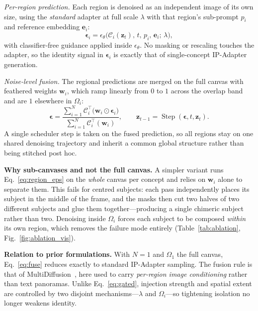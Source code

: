 \documentclass[review,10pt,times]{elsarticle}
\begin{document}
\noindent\textit{Per-region prediction.}  Each region is denoised as an
independent image of its own size, using the \emph{standard} adapter at
full scale $\lambda$ with that region's sub-prompt $p_i$ and reference
embedding $\mathbf{e}_i$:
\begin{equation}
  \boldsymbol{\epsilon}_i =
    \epsilon_\theta\!\bigl(\mathcal{C}_i(\mathbf{z}_t),\,t,\,p_i,\,
    \mathbf{e}_i;\,\lambda\bigr),
  \label{eq:region_eps}
\end{equation}
with classifier-free guidance applied inside $\epsilon_\theta$.  No
masking or rescaling touches the adapter, so the identity signal in
$\boldsymbol{\epsilon}_i$ is exactly that of single-concept
IP-Adapter generation.

\noindent\textit{Noise-level fusion.}  The regional predictions are
merged on the full canvas with feathered weights $\mathbf{w}_i$, which
ramp linearly from $0$ to $1$ across the overlap band and are $1$
elsewhere in $\Omega_i$:
\begin{equation}
  \boldsymbol{\epsilon} =
  \frac{\sum_{i=1}^{N}\mathcal{C}_i^{\!\top}
        \bigl(\mathbf{w}_i\odot\boldsymbol{\epsilon}_i\bigr)}
       {\sum_{i=1}^{N}\mathcal{C}_i^{\!\top}(\mathbf{w}_i)},
  \qquad
  \mathbf{z}_{t-1}=\operatorname{Step}(\boldsymbol{\epsilon},t,\mathbf{z}_t).
  \label{eq:fuse}
\end{equation}
A single scheduler step is taken on the fused prediction, so all
regions stay on one shared denoising trajectory and inherit a common
global structure rather than being stitched post hoc.

\noindent\textbf{Why sub-canvases and not the full canvas.}
A simpler variant runs Eq.~\ref{eq:region_eps} on the \emph{whole}
canvas per concept and relies on $\mathbf{w}_i$ alone to separate them.
This fails for centred subjects: each pass independently places its
subject in the middle of the frame, and the masks then cut two halves
of two different subjects and glue them together---producing a single
chimeric subject rather than two.  Denoising inside $\Omega_i$ forces
each subject to be composed \emph{within} its own region, which removes
the failure mode entirely (Table~\ref{tab:ablation},
Fig.~\ref{fig:ablation_vis}).

\noindent\textbf{Relation to prior formulations.}
With $N{=}1$ and $\Omega_1$ the full canvas, Eq.~\ref{eq:fuse} reduces
exactly to standard IP-Adapter sampling.  The fusion rule is that of
MultiDiffusion~\cite{bartal2023multidiffusion}, here used to carry
\emph{per-region image conditioning} rather than text panoramas.
Unlike Eq.~\ref{eq:gated}, injection strength and spatial extent are
controlled by two disjoint mechanisms---$\lambda$ and $\Omega_i$---so
tightening isolation no longer weakens identity.
\end{document}
